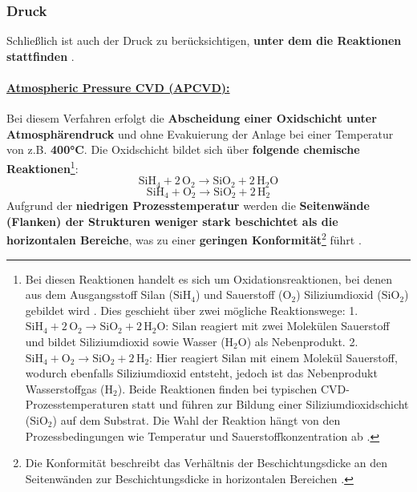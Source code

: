 \documentclass{article} %
\begin{document}


\vspace{1em}

\subsubsection{Druck} %

Schließlich ist auch der Druck zu berücksichtigen, \textbf{unter dem die Reaktionen stattfinden} \cite{keplinger2024CVD}.

\vspace{0.0em}

\paragraph{\uline{Atmospheric Pressure CVD (APCVD):}} Bei diesem Verfahren erfolgt die \textbf{Abscheidung einer Oxidschicht unter Atmosphärendruck} und ohne Evakuierung der Anlage bei einer Temperatur von z.B. \textbf{400°C}. Die Oxidschicht bildet sich über \textbf{folgende chemische Reaktionen}\footnote{Bei diesen Reaktionen handelt es sich um Oxidationsreaktionen, bei denen aus dem Ausgangsstoff Silan (\(\mathrm{SiH}_4\)) und Sauerstoff (\(\mathrm{O}_2\)) Siliziumdioxid (\(\mathrm{SiO}_2\)) gebildet wird \cite{keplinger2024CVD}. Dies geschieht über zwei mögliche Reaktionswege: 1. \(\mathrm{SiH}_4 + 2 \, \mathrm{O}_2 \rightarrow \mathrm{SiO}_2 + 2 \, \mathrm{H}_2\mathrm{O}\): Silan reagiert mit zwei Molekülen Sauerstoff und bildet Siliziumdioxid sowie Wasser (\(\mathrm{H}_2\mathrm{O}\)) als Nebenprodukt. 2. \(\mathrm{SiH}_4 + \mathrm{O}_2 \rightarrow \mathrm{SiO}_2 + 2 \, \mathrm{H}_2\): Hier reagiert Silan mit einem Molekül Sauerstoff, wodurch ebenfalls Siliziumdioxid entsteht, jedoch ist das Nebenprodukt Wasserstoffgas (\(\mathrm{H}_2\)). Beide Reaktionen finden bei typischen CVD-Prozesstemperaturen statt und führen zur Bildung einer Siliziumdioxidschicht (\(\mathrm{SiO}_2\)) auf dem Substrat. Die Wahl der Reaktion hängt von den Prozessbedingungen wie Temperatur und Sauerstoffkonzentration ab \cite{keplinger2024CVD}.}:
$$
\mathrm{SiH}_4 + 2 \, \mathrm{O}_2 \rightarrow \mathrm{SiO}_2 + 2 \, \mathrm{H}_2\mathrm{O}
$$
$$
\mathrm{SiH}_4 + \mathrm{O}_2 \rightarrow \mathrm{SiO}_2 + 2 \, \mathrm{H}_2
$$
Aufgrund der \textbf{niedrigen Prozesstemperatur} werden die \textbf{Seitenwände (Flanken) der Strukturen weniger stark beschichtet als die horizontalen Bereiche}, was zu einer \textbf{geringen Konformität}\footnote{Die Konformität beschreibt das Verhältnis der Beschichtungsdicke an den Seitenwänden zur Beschichtungsdicke in horizontalen Bereichen \cite{keplinger2024CVD}.} führt \cite{keplinger2024CVD}.
    
\end{document}
